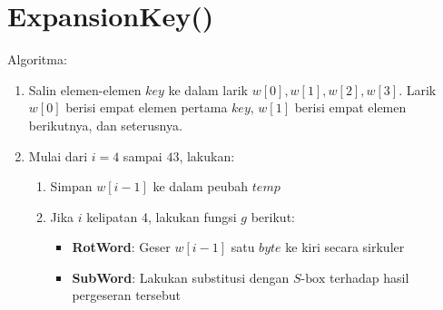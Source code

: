 \documentclass{article}
\begin{document}

\section*{ExpansionKey()}

Algoritma:

\begin{enumerate}
    \item Salin elemen-elemen $key$ ke dalam larik $w[0], w[1], w[2], w[3]$. Larik $w[0]$ berisi empat elemen pertama $key$, $w[1]$ berisi empat elemen berikutnya, dan seterusnya.
    \item Mulai dari $i = 4$ sampai $43$, lakukan:
    \begin{enumerate}
        \item Simpan $w[i-1]$ ke dalam peubah $temp$
        \item Jika $i$ kelipatan 4, lakukan fungsi $g$ berikut:
        \begin{itemize}
            \item \textbf{RotWord}: Geser $w[i-1]$ satu $byte$ ke kiri secara sirkuler
            \item \textbf{SubWord}: Lakukan substitusi dengan $S\text{-box}$ terhadap hasil pergeseran tersebut
        \end{itemize}
    \end{enumerate}
\end{enumerate}
\end{document}
